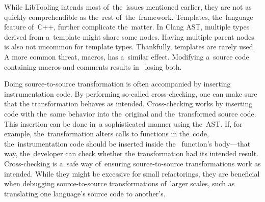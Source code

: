 While LibTooling intends most of~the~issues mentioned earlier, 
they are not as quickly comprehendible as the~rest of~the~framework. 
Templates, the~language feature of~C++, further complicate the~matter. 
In Clang AST, multiple types derived from a~template might share some nodes. 
Having multiple parent nodes is also not uncommon for template types. 
Thankfully, templates are rarely used. 
A more common threat, macros, has a~similar effect. 
Modifying a~source code containing macros and comments results in~
losing both.


Doing source-to-source transformation is often accompanied by 
inserting instrumentation code. 
By performing so-called cross-checking, one can make sure that 
the transformation behaves as intended. 
Cross-checking works by inserting code with the~same behavior 
into the~original and the~transformed source code.  
This insertion can be done in~a sophisticated manner using the~AST. 
If, for example, the~transformation alters calls to functions 
in the~code, the~instrumentation code should be inserted inside the~
function's body—that way, the~developer can check whether 
the transformation had its intended result.
Cross-checking is a~safe way of~ensuring source-to-source 
transformations work as intended. 
While they might be excessive for small refactorings, 
they are beneficial when debugging source-to-source 
transformations of~larger scales, such as translating 
one language's source code to another's.
